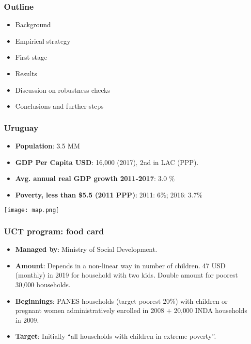 \documentclass{beamer}
\begin{document}
\begin{frame}
\frametitle{Outline}
\begin{itemize}
\item Background
\item Empirical strategy
\item First stage
\item Results
\item Discussion on robustness checks
\item Conclusions and further steps
\end{itemize}
\end{frame}

\begin{frame}
\frametitle{Uruguay}
\begin{itemize}
\item \textbf{Population}: 3.5 MM
\item \textbf{GDP Per Capita USD}: 16,000 (2017), 2nd in LAC (PPP).
\item \textbf{Avg. annual real GDP growth 2011-2017}: 3.0 \%
\item \textbf{Poverty, less than \$5.5 (2011 PPP)}: 2011: 6\%; 2016: 3.7\%	
\end{itemize}
\begin{center}
	\texttt{[image: map.png]}
	\label{map}
\end{center}
\end{frame}

\begin{frame}
\frametitle{UCT program: food card}
\begin{itemize}
\item \textbf{Managed by}: Ministry of Social Development.
\item \textbf{Amount}: Depends in a non-linear way in number of children. 47 USD (monthly) in 2019 for household with two kids. Double amount for poorest 30,000 households.
\item \textbf{Beginnings}: PANES households (target poorest 20\%) with children or pregnant women administratively enrolled in 2008 + 20,000 INDA households in 2009.
\item \textbf{Target}: Initially ``all households with children in extreme poverty''.		
\end{itemize}
\end{frame}
\end{document}

